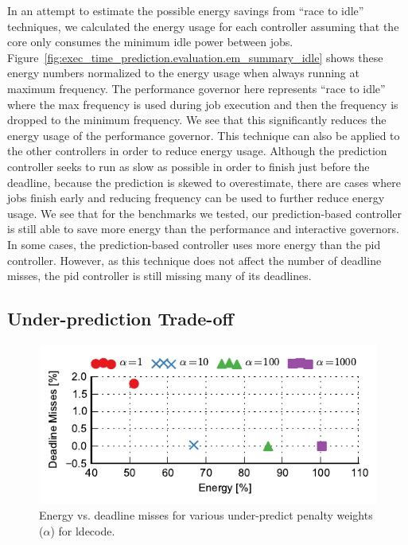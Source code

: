 In an attempt to estimate the possible energy savings from ``race to idle''
techniques, we calculated the energy usage for each controller assuming that
the core only consumes the minimum idle power between jobs.
Figure~\ref{fig:exec_time_prediction.evaluation.em_summary_idle} shows these
energy numbers normalized to the energy usage when always running at maximum
frequency. The performance governor here represents ``race to idle'' where the
max frequency is used during job execution and then the frequency is dropped to
the minimum frequency. We see that this significantly reduces the energy usage
of the performance governor. This technique can also be applied to the other
controllers in order to reduce energy usage. Although the prediction controller
seeks to run as slow as possible in order to finish just before the deadline,
because the prediction is skewed to overestimate, there are cases where jobs
finish early and reducing frequency can be used to further reduce energy usage.
We see that for the benchmarks we tested, our prediction-based controller is
still able to save more energy than the performance and interactive governors.
In some cases, the prediction-based controller uses more energy than the pid
controller. However, as this technique does not affect the number of deadline
misses, the pid controller is still missing many of its deadlines.

\subsection{Under-prediction Trade-off}

\begin{figure}
  \begin{center}
    \includegraphics{exec_time_prediction/data/underpredict_sweep.pdf}
    \caption{Energy vs. deadline misses for various under-predict penalty
    weights ($\alpha$) for ldecode.}
    \label{fig:exec_time_prediction.evaluation.underpredict_sweep}
  \end{center}
\end{figure}

